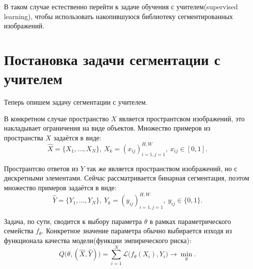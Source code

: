 \documentclass[14pt, a4paper, oneside, bold]{extarticle}
\makeatletter
\newcommand{\problemtitle}[1]{\gdef\@problemtitle{#1}}%
\newcommand{\probleminput}[1]{\gdef\@probleminput{#1}}%
\newcommand{\problemquestion}[1]{\gdef\@problemquestion{#1}}%
\makeatother
\begin{document}
В таком случае естественно перейти к задаче обучения с учителем(supervised learning), чтобы использовать накопившуюся библиотеку сегментированных изображений. 

\newpage


\section{Постановка задачи сегментации с учителем} \label{seg_supervised}

Теперь опишем задачу сегментации с учителем.

\begin{problem}
  \problemtitle{\textbf{Задача обучения с учителем}}
  \probleminput{пространство объектов $X$ и пространтсво ответов $Y$ Между ними существует соответствие(функция) $f: X \rightarrow Y$, множество примеров отображения $f: \{(X_1,\ Y_1),\ ... ,\ (X_N,\ Y_N) \},\ f(X_i) = Y_i ,\ i = \overline{1, N}$, параметрическое семейство функций $f_{\theta}: X \rightarrow Y.$}
  \problemquestion{наилучшим образом приблизить соответствие $f$ на  всём пространтстве $X$ с помощью параметрического семества функций $f_{\theta}$, используя данное множестве примеров отображения. 
}
\end{problem}

В конкретном случае пространство $X$ является пространтсвом изображений, это накладывает ограничения на виде объектов. Множество примеров из пространства $X$ задаётся в виде:
\begin{equation}
	\hat{X} = \{ X_1, ..., X_N \},\ X_k = (x_{ij})_{i=1, j=1}^{H, W}
                       	   ,\ x_{ij} \in [0, 1].
\end{equation}

Пространтсво ответов из $Y$ так же является пространством изображений, но с дискретными элементами. Сейчас рассматривается бинарная сегментация, поэтом множество примеров задаётся в виде:
\begin{equation}
	\hat{Y} = \{ Y_1, ... , Y_N \},\ Y_k = (y_{ij})_{i=1, j=1}^{H, W}
							,\ y_{ij} \in \{ 0, 1 \}.
\end{equation} 

Задача, по сути, сводится к выбору параметра $\theta$ в рамках  параметрического семейства $f_\theta$.
Конкретное значение параметра обычно выбирается изходя из функционала качества модели(функции эмпирического риска):
\begin{equation}\label{opt}
	Q \bigl( \theta, (\hat{X}, \hat{Y}) \bigr) = 
		\sum \limits_{i=1}^{N} \mathcal{L} 
		\bigl( f_{\theta}(X_i), Y_i \bigr)
		\longrightarrow \min \limits_{\theta}.
\end{equation}
\end{document}
